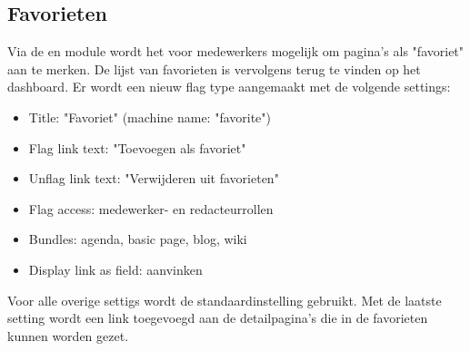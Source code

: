 \subsection{Favorieten}\label{favorieten}

Via de  en  module wordt het voor medewerkers mogelijk om pagina's als "favoriet" aan te merken. De lijst van favorieten is vervolgens terug te vinden op het dashboard. Er wordt een nieuw flag type aangemaakt met de volgende settings:
\begin{itemize}
\item Title: "Favoriet" (machine name: "favorite")
\item Flag link text: "Toevoegen als favoriet"
\item Unflag link text: "Verwijderen uit favorieten"
\item Flag access: medewerker- en redacteurrollen
\item Bundles: agenda, basic page, blog, wiki
\item Display link as field: aanvinken
\end{itemize}
Voor alle overige settigs wordt de standaardinstelling gebruikt. Met de laatste setting wordt een link toegevoegd aan de detailpagina's die in de favorieten kunnen worden gezet.

